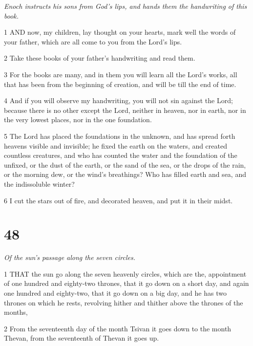 \par \textit{Enoch instructs his sons from God's lips, and hands them the handwriting of this book.}

\par 1 AND now, my children, lay thought on your hearts, mark well the words of your father, which are all come to you from the Lord's lips.

\par 2 Take these books of your father's handwriting and read them.

\par 3 For the books are many, and in them you will learn all the Lord's works, all that has been from the beginning of creation, and will be till the end of time.

\par 4 And if you will observe my handwriting, you will not sin against the Lord; because there is no other except the Lord, neither in heaven, nor in earth, nor in the very lowest places, nor in the one foundation.

\par 5 The Lord has placed the foundations in the unknown, and has spread forth heavens visible and invisible; he fixed the earth on the waters, and created countless creatures, and who has counted the water and the foundation of the unfixed, or the dust of the earth, or the sand of the sea, or the drops of the rain, or the morning dew, or the wind's breathings? Who has filled earth and sea, and the indissoluble winter?

\par 6 I cut the stars out of fire, and decorated heaven, and put it in their midst.

\chapter{48}

\par \textit{Of the sun's passage along the seven circles.}

\par 1 THAT the sun go along the seven heavenly circles, which are the, appointment of one hundred and eighty-two thrones, that it go down on a short day, and again one hundred and eighty-two, that it go down on a big day, and he has two thrones on which he rests, revolving hither and thither above the thrones of the months, 

\par 2 From the seventeenth day of the month Tsivan it goes down to the month Thevan, from the seventeenth of Thevan it goes up.

